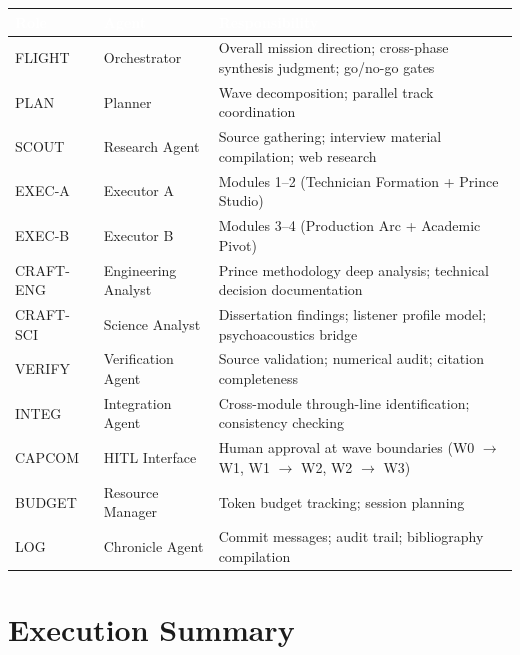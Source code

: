 \documentclass[11pt,letterpaper]{article}
\newcommand{\tableheader}[1]{\textbf{\sffamily\textcolor{white}{#1}}}
\begin{document}
\begin{center}
\begin{tabularx}{\textwidth}{L{2cm}L{3.5cm}X}
\toprule
{}
\tableheader{Role} & \tableheader{Agent} & \tableheader{Responsibility} \\
\midrule
FLIGHT & Orchestrator & Overall mission direction; cross-phase synthesis judgment; go/no-go gates \\
PLAN & Planner & Wave decomposition; parallel track coordination \\
SCOUT & Research Agent & Source gathering; interview material compilation; web research \\
EXEC-A & Executor A & Modules 1--2 (Technician Formation + Prince Studio) \\
EXEC-B & Executor B & Modules 3--4 (Production Arc + Academic Pivot) \\
CRAFT-ENG & Engineering Analyst & Prince methodology deep analysis; technical decision documentation \\
CRAFT-SCI & Science Analyst & Dissertation findings; listener profile model; psychoacoustics bridge \\
VERIFY & Verification Agent & Source validation; numerical audit; citation completeness \\
INTEG & Integration Agent & Cross-module through-line identification; consistency checking \\
CAPCOM & HITL Interface & Human approval at wave boundaries (W0 $\to$ W1, W1 $\to$ W2, W2 $\to$ W3) \\
BUDGET & Resource Manager & Token budget tracking; session planning \\
LOG & Chronicle Agent & Commit messages; audit trail; bibliography compilation \\
\bottomrule
\end{tabularx}
\end{center}

\section{Execution Summary}
\end{document}
